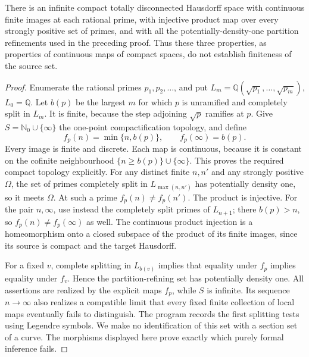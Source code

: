 \begin{proposition}
\label{D-density-model}
There is an infinite compact totally disconnected
Hausdorff space with continuous finite images at
each rational prime, with injective product
map over every strongly positive set of primes,
and with all the potentially-density-one
partition refinements used in the preceding
proof. Thus these three properties, as
properties of continuous maps of compact spaces, do not establish
finiteness of the source set.
\end{proposition}
\begin{proof}
Enumerate the rational primes $p_1,p_2,\ldots$,
and put $L_m=\mathbb Q(\sqrt{p_1},\ldots,\sqrt{p_m})$,
$L_0=\mathbb Q$. Let $b(p)$ be the largest
$m$ for which $p$ is unramified and completely
split in $L_m$. It is finite, because the
step adjoining $\sqrt p$ ramifies at $p$.
Give $S=\mathbb N_0\cup\{\infty\}$ the one-point
compactification topology, and define
\[
 f_p(n)=\min\{n,b(p)\},\qquad f_p(\infty)=b(p).
\]
Every image is finite and discrete. Each map is
continuous, because it is constant on the cofinite
neighbourhood $\{n\ge b(p)\}\cup\{\infty\}$.
This proves the required compact topology explicitly.
For any distinct finite $n,n'$
and any strongly positive $\Omega$, the set
of primes completely split in
$L_{\max(n,n')}$ has potentially density one,
so it meets $\Omega$. At such a prime
$f_p(n)\ne f_p(n')$. The product is injective.
For the pair $n,\infty$, use instead the completely
split primes of $L_{n+1}$; there $b(p)>n$, so
$f_p(n)\ne f_p(\infty)$ as well. The continuous
product injection is a homeomorphism onto a closed
subspace of the product of its finite images,
since its source is compact and the target Hausdorff.

For a fixed $v$, complete splitting in
$L_{b(v)}$ implies that equality under $f_p$
implies equality under $f_v$. Hence the
partition-refining set has potentially
density one. All assertions are realized
by the explicit maps $f_p$, while
$S$ is infinite. Its sequence $n\to\infty$
also realizes a compatible limit that every fixed
finite collection of local maps eventually fails
to distinguish. The program
records the first splitting tests using
Legendre symbols. We make no identification
of this set with a section set of a curve.
The morphisms displayed here prove exactly
which purely formal inference fails.
\end{proof}

